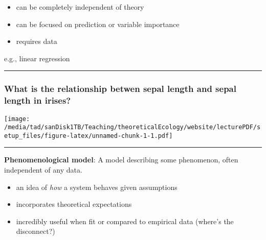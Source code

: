 \documentclass[
]{article}
\newenvironment{Shaded}{\begin{snugshade}}{\end{snugshade}}
\newcommand{\AttributeTok}[1]{\textcolor[rgb]{0.77,0.63,0.00}{#1}}
\newcommand{\DecValTok}[1]{\textcolor[rgb]{0.00,0.00,0.81}{#1}}
\newcommand{\FunctionTok}[1]{\textcolor[rgb]{0.00,0.00,0.00}{#1}}
\newcommand{\NormalTok}[1]{#1}
\newcommand{\OtherTok}[1]{\textcolor[rgb]{0.56,0.35,0.01}{#1}}
\newcommand{\SpecialCharTok}[1]{\textcolor[rgb]{0.00,0.00,0.00}{#1}}
\begin{document}
\begin{itemize}
\item
  can be completely independent of theory
\item
  can be focused on prediction or variable importance
\item
  requires data
\end{itemize}

e.g., linear regression

\begin{center}\rule{0.5\linewidth}{0.5pt}\end{center}

\hypertarget{what-is-the-relationship-betwen-sepal-length-and-sepal-length-in-irises}{%
\subsubsection{What is the relationship betwen sepal length and sepal
length in
irises?}\label{what-is-the-relationship-betwen-sepal-length-and-sepal-length-in-irises}}

\begin{Shaded}
\end{Shaded}

\texttt{[image: /media/tad/sanDisk1TB/Teaching/theoreticalEcology/website/lecturePDF/setup\_files/figure-latex/unnamed-chunk-1-1.pdf]}

\begin{center}\rule{0.5\linewidth}{0.5pt}\end{center}

\textbf{Phenomenological model}: A model describing some phenomenon,
often independent of any data.

\begin{itemize}
\item
  an idea of \emph{how} a system behaves given assumptions
\item
  incorporates theoretical expectations
\item
  incredibly useful when fit or compared to empirical data (where's the
  disconnect?)
\end{itemize}
\end{document}
